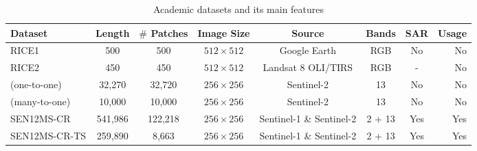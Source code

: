 \documentclass[../main.tex]{subfiles}
\begin{document}
\begin{table}[H]
	\caption{Academic datasets and its main features}
	\begin{adjustwidth}{-2cm}{}
		\begin{tabular}{l|cccccc|r}
			Dataset & Length & $\#$ Patches & Image Size & Source & Bands & SAR & Usage\\\hline
			RICE1 \cite{rice} & 500 & 500 & $512 \times 512$ & Google Earth & RGB & No  & No\\
			RICE2 \cite{rice} & 450 & 450 & $512 \times 512$ & Landsat 8 OLI/TIRS & RGB & -  & No\\
			\cite{sarukkai2019cloud} (one-to-one) & 32,270 & 32,720 & $256 \times 256$ & Sentinel-2 & 13 & No & No\\
			\cite{sarukkai2019cloud} (many-to-one) &  10,000 & 10,000 & $256 \times 256$ & Sentinel-2 & 13 & No & No\\
			SEN12MS-CR \cite{sen12mscr} & 541,986 & 122,218 & $256 \times 256$ & Sentinel-1 \& Sentinel-2 & 2 + 13 & Yes & Yes\\
			SEN12MS-CR-TS \cite{sen12mscrts} & 259,890 & 8,663 & $256 \times 256$ & Sentinel-1 \& Sentinel-2 & 2 + 13 & Yes & Yes\\
		\end{tabular}
		
		\label{tab:academic-datasets}
	\end{adjustwidth}
\end{table}
\end{document}
